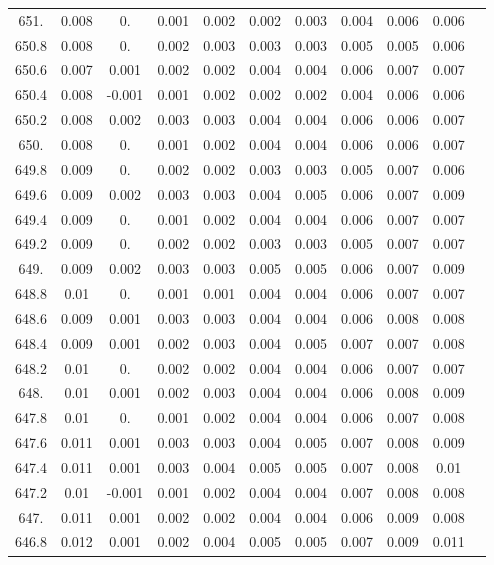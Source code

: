 \documentclass[12pt]{ctexart}
\numberwithin{equation}{section}
\begin{document}
\begin{longtable}{ccccccccccc}
651.	&	0.008	&	0.	&	0.001	&	0.002	&	0.002	&	0.003	&	0.004	&	0.006	&	0.006	\\
650.8	&	0.008	&	0.	&	0.002	&	0.003	&	0.003	&	0.003	&	0.005	&	0.005	&	0.006	\\
650.6	&	0.007	&	0.001	&	0.002	&	0.002	&	0.004	&	0.004	&	0.006	&	0.007	&	0.007	\\
650.4	&	0.008	&	-0.001	&	0.001	&	0.002	&	0.002	&	0.002	&	0.004	&	0.006	&	0.006	\\
650.2	&	0.008	&	0.002	&	0.003	&	0.003	&	0.004	&	0.004	&	0.006	&	0.006	&	0.007	\\
650.	&	0.008	&	0.	&	0.001	&	0.002	&	0.004	&	0.004	&	0.006	&	0.006	&	0.007	\\
649.8	&	0.009	&	0.	&	0.002	&	0.002	&	0.003	&	0.003	&	0.005	&	0.007	&	0.006	\\
649.6	&	0.009	&	0.002	&	0.003	&	0.003	&	0.004	&	0.005	&	0.006	&	0.007	&	0.009	\\
649.4	&	0.009	&	0.	&	0.001	&	0.002	&	0.004	&	0.004	&	0.006	&	0.007	&	0.007	\\
649.2	&	0.009	&	0.	&	0.002	&	0.002	&	0.003	&	0.003	&	0.005	&	0.007	&	0.007	\\
649.	&	0.009	&	0.002	&	0.003	&	0.003	&	0.005	&	0.005	&	0.006	&	0.007	&	0.009	\\
648.8	&	0.01	&	0.	&	0.001	&	0.001	&	0.004	&	0.004	&	0.006	&	0.007	&	0.007	\\
648.6	&	0.009	&	0.001	&	0.003	&	0.003	&	0.004	&	0.004	&	0.006	&	0.008	&	0.008	\\
648.4	&	0.009	&	0.001	&	0.002	&	0.003	&	0.004	&	0.005	&	0.007	&	0.007	&	0.008	\\
648.2	&	0.01	&	0.	&	0.002	&	0.002	&	0.004	&	0.004	&	0.006	&	0.007	&	0.007	\\
648.	&	0.01	&	0.001	&	0.002	&	0.003	&	0.004	&	0.004	&	0.006	&	0.008	&	0.009	\\
647.8	&	0.01	&	0.	&	0.001	&	0.002	&	0.004	&	0.004	&	0.006	&	0.007	&	0.008	\\
647.6	&	0.011	&	0.001	&	0.003	&	0.003	&	0.004	&	0.005	&	0.007	&	0.008	&	0.009	\\
647.4	&	0.011	&	0.001	&	0.003	&	0.004	&	0.005	&	0.005	&	0.007	&	0.008	&	0.01	\\
647.2	&	0.01	&	-0.001	&	0.001	&	0.002	&	0.004	&	0.004	&	0.007	&	0.008	&	0.008	\\
647.	&	0.011	&	0.001	&	0.002	&	0.002	&	0.004	&	0.004	&	0.006	&	0.009	&	0.008	\\
646.8	&	0.012	&	0.001	&	0.002	&	0.004	&	0.005	&	0.005	&	0.007	&	0.009	&	0.011	\\

\end{longtable}
\end{document}
